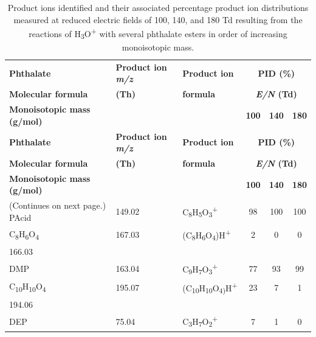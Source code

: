 {\small

\begin{longtable}[c]{lllccc}
\caption{Product ions identified and their associated percentage product ion distributions measured at reduced electric fields of 100, 140, and 180 Td resulting
from the reactions of H\textsubscript{3}O\textsuperscript{+} with several phthalate esters in order of increasing monoisotopic mass.} 
\label{table:PID}\\
\hline 
\textbf{Phthalate}& \textbf{Product ion \textit{m/z}} & \textbf{Product ion}  & \multicolumn{3}{c}{\textbf{PID (\%)}} \\ \cline{4-6} 
\textbf{Molecular formula} &\textbf{(Th)}&   \textbf{formula }& \multicolumn{3}{c}{\textbf{\textit{E/N} (Td)}} \\ \cline{4-6} 
\textbf{Monoisotopic mass (g/mol)  }      &                      &                     & \textbf{100 }     & \textbf{140}     & \textbf{180}  \\
\hline
\endfirsthead
\hline 
\textbf{Phthalate}& \textbf{Product ion \textit{m/z}} & \textbf{Product ion}  & \multicolumn{3}{c}{\textbf{PID (\%)}} \\ \cline{4-6} 
\textbf{Molecular formula} &\textbf{(Th)}&   \textbf{formula }& \multicolumn{3}{c}{\textbf{\textit{E/N} (Td)}} \\ \cline{4-6} 
\textbf{Monoisotopic mass (g/mol)  }      &                      &                     & \textbf{100 }     & \textbf{140}     & \textbf{180}  \\
\hline
\endhead
%
  (Continues on next page.)
\endfoot
%
\endlastfoot
PAcid   & 149.02  & C\textsubscript{8}H\textsubscript{5}O\textsubscript{3}\textsuperscript{+}  & 98  & 100  & 100   \\
C\textsubscript{8}H\textsubscript{6}O\textsubscript{4}  & 167.03  & (C\textsubscript{8}H\textsubscript{6}O\textsubscript{4})H\textsuperscript{+}  & 2  & 0  & 0  \\
166.03  & & & & &  \\
\hline
DMP       &    163.04    &  C\textsubscript{9}H\textsubscript{7}O\textsubscript{3}\textsuperscript{+}   & 77 & 93 & 99   \\
C\textsubscript{10}H\textsubscript{10}O\textsubscript{4}          &    195.07            & (C\textsubscript{10}H\textsubscript{10}O\textsubscript{4)}H\textsuperscript{+} & 23& 7& 1\\
194.06          & &  & & & \\
\hline
DEP       & 75.04                & C\textsubscript{3}H\textsubscript{7}O\textsubscript{2}\textsuperscript{+}      & 7            & 1            & 0            \\

\end{longtable}}
